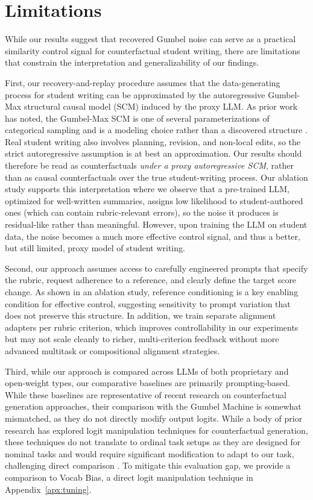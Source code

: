 \documentclass[11pt]{article}
\begin{document}
\newpage
\section*{Limitations}

While our results suggest that recovered Gumbel noise can serve as a practical similarity control signal for counterfactual student writing, there are limitations that constrain the interpretation and generalizability of our findings. 

First, our recovery-and-replay procedure assumes that the data-generating process for student writing can be approximated by the autoregressive Gumbel-Max structural causal model (SCM) induced by the proxy LLM. As prior work has noted, the Gumbel-Max SCM is one of several parameterizations of categorical sampling and is a modeling choice rather than a discovered structure \citep{chatzi2025counterfactual, benz2025evaluation}. Real student writing also involves planning, revision, and non-local edits, so the strict autoregressive assumption is at best an approximation. Our results should therefore be read as counterfactuals \emph{under a proxy autoregressive SCM}, rather than as causal counterfactuals over the true student-writing process. Our ablation study supports this interpretation where we observe that a pre-trained LLM, optimized for well-written summaries, assigns low likelihood to student-authored ones (which can contain rubric-relevant errors), so the noise it produces is residual-like rather than meaningful. However, upon training the LLM on student data, the noise becomes a much more effective control signal, and thus a better, but still limited, proxy model of student writing.

Second, our approach assumes access to carefully engineered prompts that specify the rubric, request adherence to a reference, and clearly define the target score change. As shown in an ablation study, reference conditioning is a key enabling condition for effective control, suggesting sensitivity to prompt variation that does not preserve this structure. In addition, we train separate alignment adapters per rubric criterion, which improves controllability in our experiments but may not scale cleanly to richer, multi-criterion feedback without more advanced multitask or compositional alignment strategies.

Third, while our approach is compared across LLMs of both proprietary and open-weight types, our comparative baselines are primarily prompting-based. While these baselines are representative of recent research on counterfactual generation approaches, their comparison with the Gumbel Machine is somewhat mismatched, as they do not directly modify output logits. While a body of prior research has explored logit manipulation techniques for counterfactual generation, these techniques do not translate to ordinal task setups as they are designed for nominal tasks and would require significant modification to adapt to our task, challenging direct comparison \cite{krause2021gedi, yang2021fudge, dathathri_plug_2019}. To mitigate this evaluation gap, we provide a comparison to Vocab Bias, a direct logit manipulation technique in Appendix~\ref{apx:tuning}.
\end{document}
